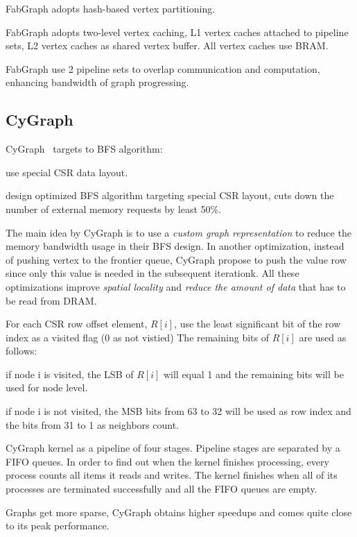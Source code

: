 \documentclass[UTF8,12pt,a4paper]{article}
\begin{document}
FabGraph adopts hash-based vertex partitioning.

FabGraph adopts two-level vertex caching,
L1 vertex caches attached to pipeline sets,
L2 vertex caches as shared vertex buffer.
All vertex caches use BRAM.

FabGraph use 2 pipeline sets to overlap
communication and computation,
enhancing bandwidth of graph progressing.
\subsection{CyGraph}
CyGraph~\cite{DBLP:conf/ipps/AttiaJTJZ14}
targets to BFS algorithm:
\begin{compactitem}
  \item use special CSR data layout.
  \item design optimized BFS algorithm targeting special CSR layout,
  cuts down the number of external memory requests by least 50\%.
\end{compactitem}

The main idea by CyGraph is to use a \textit{custom graph representation}
to reduce the memory bandwidth usage in their BFS design.
In another optimization, instead of pushing vertex to the frontier queue,
CyGraph propose to push the value row since only this value is needed in the subsequent iterationk.
All these optimizations improve \textit{spatial locality}
and \textit{reduce the amount of data} that has to be read from DRAM.

For each CSR row offset element, $R[i]$,
use the least significant bit of the row index as a visited flag
(0 as not vistied)
The remaining bits of $R[i]$ are used as follows:
\begin{compactitem}
  \item if node i is visited,
  the LSB of $R[i]$ will equal 1
  and the remaining bits will be used for node level.
  \item if node i is not visited,
  the MSB bits from 63 to 32 will be used as row index
  and the bits from 31 to 1 as neighbors count.
\end{compactitem}

CyGraph kernel as a pipeline of four stages.
Pipeline stages are separated by a FIFO queues.
In order to find out when the kernel finishes processing,
every process counts all items it reads and writes.
The kernel finishes when all of its processes
are terminated successfully and all the FIFO queues are empty.

Graphs get more sparse, CyGraph obtains higher speedups
and comes quite close to its peak performance.
\end{document}

